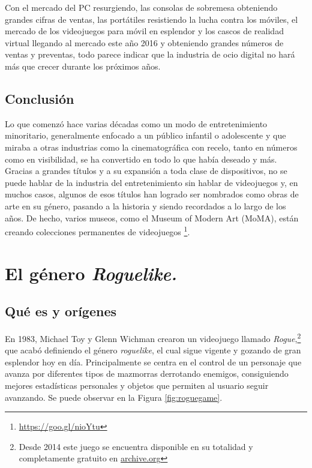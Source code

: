 Con el mercado del PC resurgiendo, las consolas de sobremesa obteniendo grandes cifras de ventas, las portátiles resistiendo la lucha contra los móviles, el mercado de los videojuegos para móvil en esplendor y los cascos de realidad virtual llegando al mercado este año 2016 y obteniendo grandes números de ventas y preventas, todo parece indicar que la industria de ocio digital no hará más que crecer durante los próximos años.

\subsection{Conclusión}

Lo que comenzó hace varias décadas como un modo de entretenimiento minoritario, generalmente enfocado a un público infantil o adolescente y que miraba a otras industrias como la cinematográfica con recelo, tanto en números como en visibilidad, se ha convertido en todo lo que había deseado y más. Gracias a grandes títulos y a su expansión a toda clase de dispositivos, no se puede hablar de la industria del entretenimiento sin hablar de videojuegos y, en muchos casos, algunos de esos títulos han logrado ser nombrados como obras de arte en su género, pasando a la historia y siendo recordados a lo largo de los años.
De hecho, varios museos, como el Museum of Modern Art (MoMA), están creando colecciones permanentes de videojuegos \footnote{\url{https://goo.gl/nioYtu}}.

\section{El género \textit{Roguelike.}}
\label{sec:roguelikeinformacion}

\subsection{Qué es y orígenes}

En 1983, Michael Toy y Glenn Wichman crearon un videojuego llamado \textit{Rogue},\footnote{Desde 2014 este juego se encuentra disponible en su totalidad y completamente gratuito en \href{https://archive.org/details/msdos_Rogue_1983}{archive.org}} que acabó definiendo el género \textit{roguelike}, el cual sigue vigente y gozando de gran esplendor hoy en día. Principalmente se centra en el control de un personaje que avanza por diferentes tipos de mazmorras derrotando enemigos, consiguiendo mejores estadísticas personales y objetos que permiten al usuario seguir avanzando. Se puede observar en la Figura \ref{fig:roguegame}.

